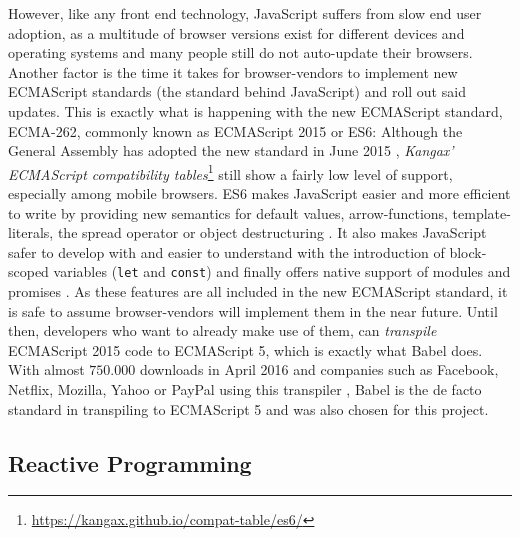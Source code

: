 However, like any front end technology, JavaScript suffers from slow end user adoption, as a multitude of browser versions exist for different devices and operating systems and many people still do not auto-update their browsers. Another factor is the time it takes for browser-vendors to implement new ECMAScript standards (the standard behind JavaScript) and roll out said updates. This is exactly what is happening with the new ECMAScript standard, ECMA-262, commonly known as ECMAScript 2015 or ES6: Although the General Assembly has adopted the new standard in June 2015 \cite{ecma2015}, \emph{Kangax' ECMAScript compatibility tables}\footnote{\url{https://kangax.github.io/compat-table/es6/}} still show a fairly low level of support, especially among mobile browsers. ES6 makes JavaScript easier and more efficient to write by providing new semantics for default values, arrow-functions, template-literals, the spread operator or object destructuring \cite{es6}. It also makes JavaScript safer to develop with and easier to understand with the introduction of block-scoped variables (\texttt{let} and \texttt{const}) and finally offers native support of modules and promises \cite{es6}.
As these features are all included in the new ECMAScript standard, it is safe to assume browser-vendors will implement them in the near future. Until then, developers who want to already make use of them, can \emph{transpile} ECMAScript 2015 code to ECMAScript 5, which is exactly what Babel does. With almost $750.000$ downloads in April 2016 \cite{npm-babel} and companies such as Facebook, Netflix, Mozilla, Yahoo or PayPal using this transpiler \cite{babel-users}, Babel is the de facto standard in transpiling to ECMAScript 5 and was also chosen for this project.

\subsection{Reactive Programming}
\label{sec:implementation-technologies-rxjs}

